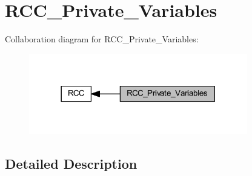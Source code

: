 \hypertarget{group___r_c_c___private___variables}{}\section{R\+C\+C\+\_\+\+Private\+\_\+\+Variables}
\label{group___r_c_c___private___variables}
Collaboration diagram for R\+C\+C\+\_\+\+Private\+\_\+\+Variables\+:
\nopagebreak
\begin{figure}[H]
\begin{center}
\leavevmode
\includegraphics[width=270pt]{group___r_c_c___private___variables}
\end{center}
\end{figure}


\subsection{Detailed Description}
